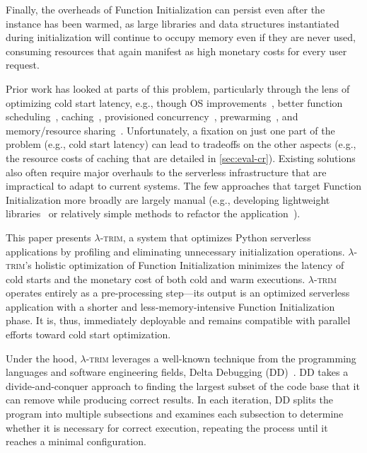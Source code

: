 \documentclass[sigplan,nonacm]{acmart}
\newcommand{\sys}{\textsc{\ensuremath{\lambda}-trim}\xspace}
\begin{document}
Finally, the overheads of Function Initialization can persist even after the instance has been warmed, as large libraries and data structures instantiated during initialization will continue to occupy memory even if they are never used, consuming resources that again manifest as high monetary costs for every user request.

Prior work has looked at parts of this problem, particularly through the lens of optimizing cold start latency, e.g., though OS improvements~\cite{firecracker2020, catalyzer2020, faasnap2022}, better function scheduling~\cite{caerus2021, LCS2023, sustainableServerless24}, caching~\cite{faascache2021,SCache23,rainbowcake, containerLoading2023,wild2020,kraken2021}, provisioned concurrency~\cite{provisionedConcurrency}, prewarming~\cite{icebreaker22}, and memory/resource sharing~\cite{medes22, tetris2022, containerSharing2022}.
Unfortunately, a fixation on just one part of the problem (e.g., cold start latency) can lead to tradeoffs on the other aspects (e.g., the resource costs of caching that are detailed in \cref{sec:eval-cr}).
Existing solutions also often require major overhauls to the serverless infrastructure that are impractical to adapt to current systems.
The few approaches that target Function Initialization more broadly are largely manual (e.g., developing lightweight libraries~\cite{libprof2024} or relatively simple methods to refactor the application~\cite{faaslight2023, serverless-app-dev2021, fusion2023}).






This paper presents \sys, a system that optimizes Python serverless applications by profiling and eliminating unnecessary initialization operations.
\sys's holistic optimization of Function Initialization minimizes the latency of cold starts and the monetary cost of both cold and warm executions.
\sys operates entirely as a pre-processing step---its output is an optimized serverless application with a shorter and less-memory-intensive Function Initialization phase.
It is, thus, immediately deployable and remains compatible with parallel efforts toward cold start optimization.



 







Under the hood, \sys leverages a well-known technique from the programming languages and software engineering fields, Delta Debugging (DD)~\cite{delta2002}.
DD takes a divide-and-conquer approach to finding the largest subset of the code base that it can remove while producing correct results.
In each iteration, DD splits the program into multiple subsections and examines each subsection to determine whether it is necessary for correct execution, repeating the process until it reaches a minimal configuration.
\end{document}
